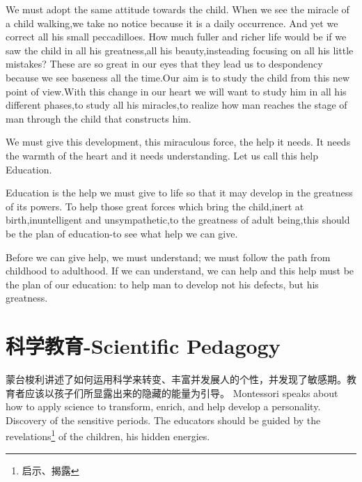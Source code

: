 \documentclass[lang=cn,10pt]{elegantbook}
\begin{document}
We must adopt the same attitude towards the child. When we see the miracle of a child walking,we take no notice because it is a daily occurrence. And yet we correct all his small peccadilloes. How much fuller and richer life would be if we saw the child in all his greatness,all his beauty,insteading focusing on all his little mistakes? These are so great in our eyes that they lead us to despondency because we see baseness all the time.Our aim is to study the child from this new point of view.With this change in our heart we will want to study him in all his different phases,to study all his miracles,to realize how man reaches the stage of man through the child that constructs him.

We must give this development, this miraculous force, the help it needs. It needs the warmth of the heart and it needs understanding. Let us call this help Education.

Education is the help we must give to life so that it may develop in the greatness of its powers. To help those great forces which bring the child,inert at birth,inuntelligent and unsympathetic,to the greatness of adult being,this should be the plan of education-to see what help we can give.

Before we can give help, we must understand; we must follow the path from childhood to adulthood. If we can understand, we can help and this help must be the plan of our education: to help man to develop not his defects, but his greatness.

\chapter{科学教育-Scientific Pedagogy}

\begin{tcolorbox}[title=摘要,
colback=red!5!white,
colframe=red!75!black,
fonttitle=\bfseries]
蒙台梭利讲述了如何运用科学来转变、丰富并发展人的个性，并发现了敏感期。教育者应该以孩子们所显露出来的隐藏的能量为引导。
Montessori speaks about how to apply science to transform, enrich, and help develop a personality. Discovery of the sensitive periods. The educators should be guided by the revelations\footnote{启示、揭露} of the children, his hidden energies.
\end{tcolorbox}
\end{document}

